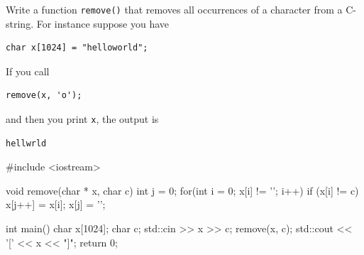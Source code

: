 \newpage
\nextq
Write a function \verb!remove()! that removes all occurrences of a
character from a C-string.
For instance suppose you have
\vspace{-2mm}
\begin{Verbatim}[frame=single,fontsize=\small]
char x[1024] = "helloworld";
\end{Verbatim}
\vspace{-5mm}
If you call
\vspace{-3mm}
\begin{Verbatim}[frame=single,fontsize=\small]
remove(x, 'o');
\end{Verbatim}
\vspace{-4mm}
and then you print \verb!x!, the output is
\vspace{-3mm}
\begin{Verbatim}[frame=single,fontsize=\small]
hellwrld
\end{Verbatim}
\ANSWER
\begin{answercode}
#include <iostream>

void remove(char * x, char c)
{
  int j = 0;
  for(int i = 0; x[i] != '\0'; i++)
  {
    if (x[i] != c)
    {
      x[j++] = x[i];
    }
  }
  x[j] = '\0';
}

int main()
{
    char x[1024];
    char c;
    std::cin >> x >> c;
    remove(x, c);
    std::cout << '[' << x << "]\n";
    return 0;
}
\end{answercode}


